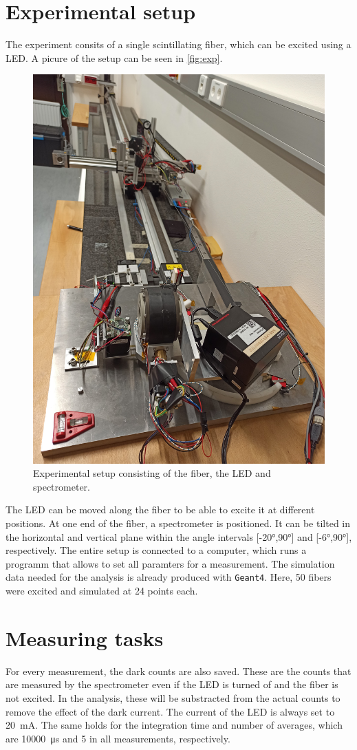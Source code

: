 \section{Experimental setup}
\label{sec:Experimental setup}

The experiment consits of a single scintillating fiber, which can be excited using a LED.
A picure of the setup can be seen in \autoref{fig:exp}.

\begin{figure}[H]
	\centering
	\includegraphics[width=0.5\linewidth]{pics/setup.jpg}
	\caption{Experimental setup consisting of the fiber, the LED and spectrometer.}
	\label{fig:exp}
\end{figure}

The LED can be moved along the fiber to be able to excite it at different positions. At one end of the fiber,
a spectrometer is positioned. It can be tilted in the horizontal and vertical plane within the angle intervals [-20°,90°]
and [-6°,90°], respectively.
The entire setup is connected to a computer, which runs a programm that allows to set all paramters for a measurement.
The simulation data needed for the analysis is already produced with \texttt{Geant4}. Here, 50 fibers were excited and simulated at 24 points each.

\section{Measuring tasks}
\label{sec:Measuring tasks}

For every measurement, the dark counts are also saved. These are the counts that are measured by the spectrometer even
if the LED is turned of and the fiber is not excited. In the analysis, these will be substracted from the actual counts
to remove the effect of the dark current.
The current of the LED is always set to \qty{20}{\milli\ampere}. The same holds for the integration time and number of
averages, which are \qty{10000}{\micro\second} and \qty{5}{} in all measurements, respectively.

